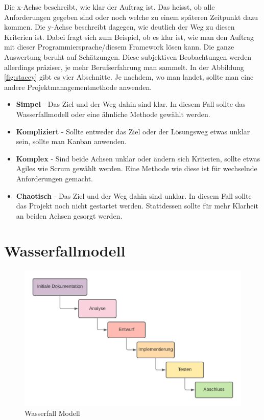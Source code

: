 Die x-Achse beschreibt, wie klar der Auftrag ist. Das heisst, ob alle Anforderungen gegeben sind oder noch welche zu einem späteren Zeitpunkt dazu kommen. Die y-Achse beschreibt dagegen, wie deutlich der Weg zu diesen Kriterien ist. Dabei fragt sich zum Beispiel, ob es klar ist, wie man den Auftrag mit dieser Programmiersprache/diesem Framework lösen kann.
\newline
Die ganze Auswertung beruht auf Schätzungen. Diese subjektiven Beobachtungen werden allerdings präziser, je mehr Berufserfahrung man sammelt.
\newline
In der Abbildung \ref*{fig:stacey} gibt es vier Abschnitte. Je nachdem, wo man landet, sollte man eine andere Projektmanagementmethode anwenden.
\newpage
\begin{itemize}
  \item \textbf{Simpel} - Das Ziel und der Weg dahin sind klar. In diesem Fall sollte das Wasserfallmodell oder eine ähnliche Methode gewählt werden.
  \item \textbf{Kompliziert} - Sollte entweder das Ziel oder der Lösungsweg etwas unklar sein, sollte man Kanban anwenden.
  \item \textbf{Komplex} - Sind beide Achsen unklar oder ändern sich Kriterien, sollte etwas Agiles wie Scrum gewählt werden. Eine Methode wie diese ist für wechselnde Anforderungen gemacht.
  \item \textbf{Chaotisch} - Das Ziel und der Weg dahin sind unklar. In diesem Fall sollte das Projekt noch nicht gestartet werden. Stattdessen sollte für mehr Klarheit an beiden Achsen gesorgt werden. 
\end{itemize}

\section{Wasserfallmodell}

\begin{figure}[!ht]
  \centering
  \includegraphics[width=.95\linewidth]{./images/OSEDashboard_Wasserfall.png}
  \caption[Ein von mir mit Lucidchart erstelltes Wasserfallmodell]{Wasserfall Modell}
  \label{fig:wasserfall}
\end{figure}

